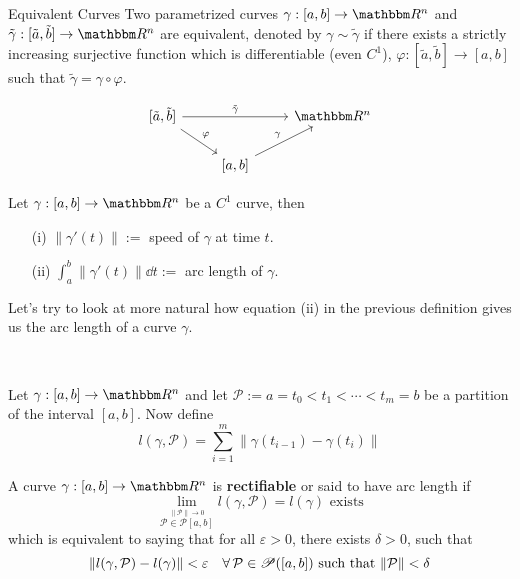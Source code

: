 \documentclass[../Analysis-3]{subfiles}
\begin{document}
\begin{Def}{Equivalent Curves}{}
    Two parametrized curves $\gamma : [a,b] \to \R^n$ and $\tilde{\gamma} : [\tilde{a}, \tilde{b}] \to \R^n$ are equivalent, denoted by $\gamma \sim \tilde{\gamma}$ if there exists a strictly increasing surjective function which is differentiable (even $C^1$), $\varphi : [\tilde{a},\tilde{b}] \to [a,b]$ such that $\tilde{\gamma} = \gamma \circ \varphi$.

    \[\begin{tikzcd}
            {[\tilde{a}, \tilde{b}]} && {\R^n} \\
            & {[a, b]}
            \arrow["\varphi", from=1-1, to=2-2]
            \arrow["\gamma", from=2-2, to=1-3]
            \arrow["{\tilde{\gamma}}", from=1-1, to=1-3]
        \end{tikzcd}\]
\end{Def}

\begin{Def}{}{}
    Let $\gamma : [a,b] \to \R^n$ be a $C^1$ curve, then
    \begin{enumerate}
        \item[(i)] $\| \gamma'(t) \| :=$ speed of $\gamma$ at time $t$.
        \item[(ii)] $\displaystyle\int_a^b \| \gamma'(t) \| \dd t :=$ arc length of $\gamma$.
    \end{enumerate}
\end{Def}

Let's try to look at more natural how equation (ii) in the previous definition gives us the arc length of a curve $\gamma$.

\

Let $\gamma : [a,b] \to \R^n$ and let $\mathcal{P} := a = t_0 < t_1 < \cdots < t_m = b $ be a partition of the interval $[a,b]$. Now define
\[
    l(\gamma,\mathcal{P}) = \sum_{i=1}^m \| \gamma(t_{i-1}) - \gamma(t_i) \|
\]


\begin{Def}{}{}
    A curve $\gamma : [a,b] \to \R^n$ is \textbf{rectifiable} or said to have arc length if
    \[
        \lim_{\overset{\|\mathcal{P}\| \to 0}{\mathcal{P} \in \mathscr{P}[a,b]}} l(\gamma,\mathcal{P}) = l(\gamma) \mbox{ exists}
    \]
    which is equivalent to saying that for all $\varepsilon > 0$, there exists $\delta >0$, such that
    \[
        \norm{l(\gamma,\mathcal{P}) - l(\gamma)} < \varepsilon \quad \forall \, \mathcal{P} \in \mathscr{P}([a,b]) \mbox{ such that } \norm{\mathcal{P}} < \delta
    \]
\end{Def}
\end{document}
